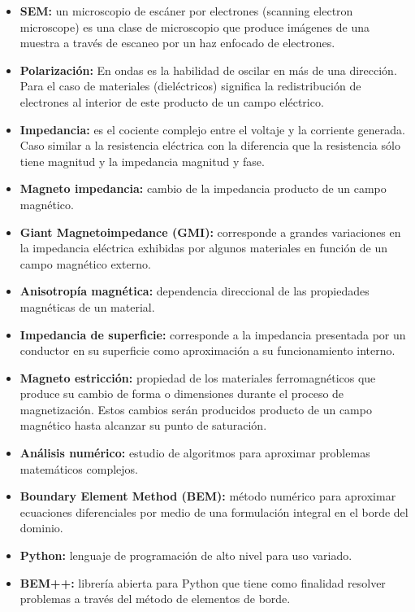 \documentclass[12pt,letterpaper]{article}
\numberwithin{equation}{section}
\begin{document}
\begin{itemize}
	\item \textbf{SEM:} un microscopio de escáner por electrones (scanning electron microscope) es una clase de microscopio que produce imágenes de una muestra a través de escaneo por un haz enfocado de electrones.
	\item \textbf{Polarización:} En ondas es la habilidad de oscilar en más de una dirección. Para el caso de materiales (dieléctricos) significa la redistribución de electrones al interior de este producto de un campo eléctrico.
	\item \textbf{Impedancia:} es el cociente complejo entre el voltaje y la corriente generada. Caso similar a la resistencia eléctrica con la diferencia que la resistencia sólo tiene magnitud y la impedancia magnitud y fase.
	\item \textbf{Magneto impedancia:} cambio de la impedancia producto de un campo magnético.
	\item \textbf{Giant Magnetoimpedance (GMI):} corresponde a grandes variaciones en la impedancia eléctrica exhibidas por algunos materiales en función de un campo magnético externo.
	\item \textbf{Anisotropía magnética:} dependencia direccional de las propiedades magnéticas de un material.
	\item \textbf{Impedancia de superficie:} corresponde a la impedancia presentada por un conductor en su superficie como aproximación a su funcionamiento interno. 
	\item \textbf{Magneto estricción:} propiedad de los materiales ferromagnéticos que produce su cambio de forma o dimensiones durante el proceso de magnetización. Estos cambios serán producidos producto de un campo magnético hasta alcanzar su punto de saturación.
	\item \textbf{Análisis numérico:} estudio de algoritmos para aproximar problemas matemáticos complejos.
	\item \textbf{Boundary Element Method (BEM):} método numérico para aproximar ecuaciones diferenciales por medio de una formulación integral en el borde del dominio.
	\item \textbf{Python:} lenguaje de programación de alto nivel para uso variado.
	\item \textbf{BEM++:} librería abierta para Python que tiene como finalidad resolver problemas a través del método de elementos de borde.
	
\end{itemize}
\pagebreak
\tableofcontents
\end{document}
